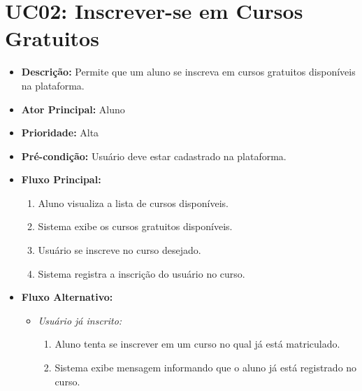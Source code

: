         \section*{UC02: Inscrever-se em Cursos Gratuitos}

        \begin{itemize}
            \item \textbf{Descrição:} Permite que um aluno se inscreva em cursos gratuitos disponíveis na plataforma.
            
            \item \textbf{Ator Principal:} Aluno
            
            \item \textbf{Prioridade:} Alta
            
            \item \textbf{Pré-condição:} Usuário deve estar cadastrado na plataforma.
            
            \item \textbf{Fluxo Principal:}
            \begin{enumerate}
                \item Aluno visualiza a lista de cursos disponíveis.
                \item Sistema exibe os cursos gratuitos disponíveis.
                \item Usuário se inscreve no curso desejado.
                \item Sistema registra a inscrição do usuário no curso.
            \end{enumerate}

            \item \textbf{Fluxo Alternativo:}
            \begin{itemize}
                \item \textit{Usuário já inscrito:}
                \begin{enumerate}
                    \item Aluno tenta se inscrever em um curso no qual já está matriculado.
                    \item Sistema exibe mensagem informando que o aluno já está registrado no curso.
                \end{enumerate}
            \end{itemize}
        \end{itemize}


